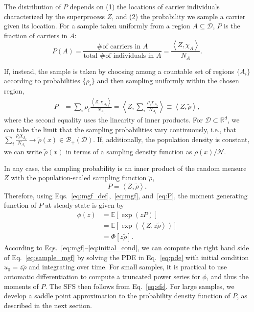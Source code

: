 \documentclass{article}
\begin{document}
The distribution of $P$ depends on (1) the locations of carrier individuals characterized by the superprocess $Z$, and (2) the probability we sample a carrier given its location.
For a sample taken uniformly from a region $A \subseteq \mathcal{D}$, $P$ is the fraction of carriers in $A$:
\begin{equation}
    P(A) = \frac{\text{\# of carriers in $A$}}{\text{total \# of individuals in $A$}} = \frac{\left<Z, \chi_A \right>}{N_A}.
\end{equation}

If, instead, the sample is taken by choosing among a countable set of regions $\{ A_i\}$ according to probabilities $\{ \rho_i \}$ and then sampling uniformly within the chosen region,
\begin{align}
    P & = \sum_i \rho_i \frac{\left<Z, \chi_{A_i} \right>}{N_{A_i}}
       = \left< Z, \sum_i \frac{\rho_i \chi_{A_i}}{N_{A_i}} \right>
       \equiv \left< Z, \tilde \rho \right>,
\end{align}
where the second equality uses the linearity of inner products.
For $\mathcal{D} \subset \mathbb{R}^d$, we can take the limit that the sampling probabilities vary continuously, i.e., that $\sum_i \frac{\rho_i \chi_{A_i}}{N_{A_i}} \to \tilde \rho (x) \in \mathcal{B}_{+}(\mathcal{D})$.
If, additionally, the population density is constant, we can write $\tilde \rho(x)$ in terms of a sampling density function as $\rho(x) / \mathcal{N}$.

In any case, the sampling probability is an inner product of the random measure $Z$ with the population-scaled sampling function $\tilde \rho$,
\begin{equation}
    P = \left< Z, \tilde \rho \right>.
    \label{eq:P}
\end{equation}
Therefore, using Eqs.~\ref{eq:mgf_def},~\ref{eq:mgf}, and~\ref{eq:P}, the moment generating function of $P$ at steady-state is given by
\begin{align}
    \phi(z) & = \mathbb{E}\left[ \exp\left(zP\right) \right] \nonumber \\
            & = \mathbb{E}\left[ \exp\left( \left< Z, z \tilde \rho \right> \right)\right] \nonumber \\
            & = \Phi[z \tilde \rho].
            \label{eq:sample_mgf}
\end{align}
According to Eqs.~\ref{eq:mgf}--\ref{eq:initial_cond}, we can compute the right hand side of Eq.~\ref{eq:sample_mgf} by solving the PDE in Eq.~\ref{eq:pde} with initial condition $u_0 = z \tilde \rho$ and integrating over time.
For small samples, it is practical to use automatic differentiation to compute a truncated power series for $\phi$, and thus the moments of $P$.
The SFS then follows from Eq.~\ref{eq:sfs}.
For large samples, we develop a saddle point approximation to the probability density function of $P$, as described in the next section.
\end{document}
